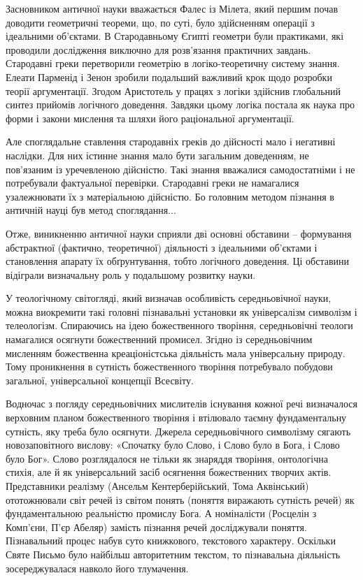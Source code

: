 Засновником античної науки вважається Фалес із Мілета, який першим
почав доводити геометричні теореми, що, по суті, було здійсненням операції з
ідеальними об’єк\-та\-ми. В Стародавньому Єгипті геометри були практиками, які
проводили дослідження виключно для розв’язання практичних завдань.
Стародавні греки перетворили геометрію в логіко-теоретичну систему знання.
Елеати Парменід і Зенон зробили подальший важливий крок щодо розробки
теорії аргументації. Згодом Аристотель у працях з логіки здійснив глобальний
синтез прийомів логічного доведення. Завдяки цьому логіка постала як наука
про форми і закони мислення та шляхи його раціональної аргументації.

Але споглядальне ставлення стародавніх греків до дійсності мало і
негативні наслідки. Для них істинне знання мало бути загальним доведенням,
не пов’язаним із уречевленою дійсністю. Такі знання вважалися
самодостатніми і не потребували фактуальної перевірки. Стародавні греки не
намагалися узалежнювати їх з матеріальною дійсністю. Бо головним методом
пізнання в античній науці був метод споглядання...

Отже, виникненню античної науки сприяли дві основні обставини –
формування абстрактної (фактично, теоретичної) діяльності з ідеальними
об’єктами і становлення апарату їх обґрунтування, тобто логічного доведення.
Ці обставини відіграли визначальну роль у подальшому розвитку науки.

У теологічному світогляді, який визначав особливість середньовічної науки,
можна виокремити такі головні пізнавальні установки як універсалізм
символізм і телеологізм. Спираючись на ідею божественного творіння,
середньовічні теологи намагалися осягнути божественний промисел. Згідно із
середньовічним мисленням божественна креаціоністська діяльність мала
універсальну природу. Тому проникнення в сутність божественного творіння
потребувало побудови загальної, універсальної концепції Всесвіту.

Водночас з погляду середньовічних мислителів існування кожної речі
визначалося верховним планом божественного творіння і втілювало таємну
фундаментальну сутність, яку треба було осягнути. Джерела середньовічного
символізму сягають новозаповітного вислову: «Спочатку було Слово, і Слово
було в Бога, і Слово було Бог». Слово розглядалося не тільки як знаряддя
творіння, онтологічна стихія, але й як універсальний засіб осягнення
божественних творчих актів. Представники реалізму
(Ансельм Кентерберійський, Тома Аквінський) ототожнювали світ речей із
світом понять (поняття виражають сутність речей) як фундаментальною
реальністю промислу Бога. А номіналісти (Росцелін з Комп’єни, П’єр Абеляр)
замість пізнання речей досліджували поняття. Пізнавальний процес набув суто
книжкового, текстового характеру. Оскільки Святе Письмо було найбільш
авторитетним текстом, то пізнавальна діяльність зосереджувалася навколо його
тлумачення.

